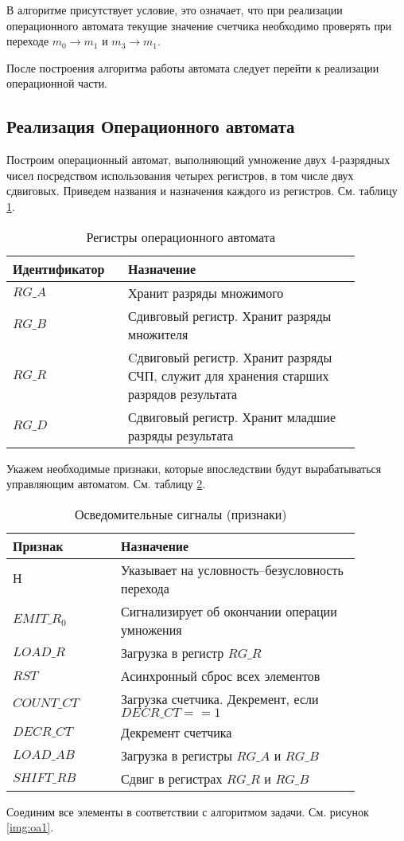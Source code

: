 \documentclass[a4paper,14pt]{extarticle}
\begin{document}
В алгоритме присутствует условие, это означает, что при реализации операционного автомата текущие значение счетчика необходимо проверять при переходе $m_0 \to m_1$ и $m_3 \to m_1$.

После построения алгоритма работы автомата следует перейти к реализации операционной части.

\subsection {Реализация Операционного автомата}
Построим операционный автомат, выполняющий умножение двух 4-разрядных чисел посредством использования четырех регистров, в том числе двух сдвиговых. Приведем названия и назначения каждого из регистров. См. таблицу \ref{tab:regs1}.
\begin{table}[h!]
	\centering
	\begin{tabular}{|p{0.27\linewidth}|p{0.6\linewidth}|}
		\hline
		\textbf{Идентификатор} & \textbf{Назначение} \\ \hline
		$RG\_A$ & Хранит разряды множимого \\ \hline
		$RG\_B$ & Сдивговый регистр. Хранит разряды множителя \\ \hline
		$RG\_R$ & Cдвиговый регистр. Хранит разряды СЧП, служит для хранения старших разрядов результата \\ \hline
		$RG\_D$ & Сдвиговый регистр. Хранит младшие разряды результата \\ \hline
	\end{tabular}
	\caption{Регистры операционного автомата}
	\label{tab:regs1}
\end{table}

Укажем необходимые признаки, которые впоследствии будут вырабатываться управляющим автоматом. См. таблицу \ref{tab:signals1}.
\begin{table}[h!]
	\centering
	\begin{tabular}{|p{0.27\linewidth}|p{0.6\linewidth}|}
		\hline
		\textbf{Признак} & \textbf{Назначение} \\ \hline
		$Н$ & Указывает на условность--безусловность перехода \\ \hline
		$EMIT\_R_0$ & Сигнализирует об окончании операции умножения \\ \hline
		$LOAD\_R$ & Загрузка в регистр $RG\_R$ \\ \hline
		$RST$ & Асинхронный сброс всех элементов \\ \hline
		$COUNT\_CT$ & Загрузка счетчика. Декремент, если $DECR\_CT==1$ \\ \hline
		$DECR\_CT$ & Декремент счетчика \\ \hline
		$LOAD\_AB$ & Загрузка в регистры $RG\_A \text{ и } RG\_B$ \\ \hline
		$SHIFT\_RB$ & Сдвиг в регистрах $RG\_R \text{ и } RG\_B$ \\ \hline
	\end{tabular}
	\caption{Осведомительные сигналы (признаки)}
	\label{tab:signals1}
\end{table}
Соединим все элементы в соответствии с алгоритмом задачи. См. рисунок \ref{img:oa1}.
\end{document}
